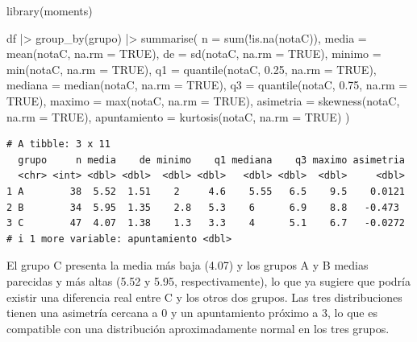 \documentclass[
  spanish,
  a4paper,
]{scrreport}
\newenvironment{Shaded}{\begin{snugshade}}{\end{snugshade}}
\newcommand{\AttributeTok}[1]{\textcolor[rgb]{0.40,0.45,0.13}{#1}}
\newcommand{\ConstantTok}[1]{\textcolor[rgb]{0.56,0.35,0.01}{#1}}
\newcommand{\FloatTok}[1]{\textcolor[rgb]{0.68,0.00,0.00}{#1}}
\newcommand{\FunctionTok}[1]{\textcolor[rgb]{0.28,0.35,0.67}{#1}}
\newcommand{\NormalTok}[1]{\textcolor[rgb]{0.00,0.23,0.31}{#1}}
\newcommand{\SpecialCharTok}[1]{\textcolor[rgb]{0.37,0.37,0.37}{#1}}
\theoremstyle{definition}
\theoremstyle{definition}
\theoremstyle{remark}
\begin{document}
\begin{Shaded}
\begin{Highlighting}[]
\FunctionTok{library}\NormalTok{(moments)}

\NormalTok{df }\SpecialCharTok{|\textgreater{}}
  \FunctionTok{group\_by}\NormalTok{(grupo) }\SpecialCharTok{|\textgreater{}}
  \FunctionTok{summarise}\NormalTok{(}
    \AttributeTok{n =} \FunctionTok{sum}\NormalTok{(}\SpecialCharTok{!}\FunctionTok{is.na}\NormalTok{(notaC)),}
    \AttributeTok{media =} \FunctionTok{mean}\NormalTok{(notaC, }\AttributeTok{na.rm =} \ConstantTok{TRUE}\NormalTok{),}
    \AttributeTok{de =} \FunctionTok{sd}\NormalTok{(notaC, }\AttributeTok{na.rm =} \ConstantTok{TRUE}\NormalTok{),}
    \AttributeTok{minimo =} \FunctionTok{min}\NormalTok{(notaC, }\AttributeTok{na.rm =} \ConstantTok{TRUE}\NormalTok{),}
    \AttributeTok{q1 =} \FunctionTok{quantile}\NormalTok{(notaC, }\FloatTok{0.25}\NormalTok{, }\AttributeTok{na.rm =} \ConstantTok{TRUE}\NormalTok{),}
    \AttributeTok{mediana =} \FunctionTok{median}\NormalTok{(notaC, }\AttributeTok{na.rm =} \ConstantTok{TRUE}\NormalTok{),}
    \AttributeTok{q3 =} \FunctionTok{quantile}\NormalTok{(notaC, }\FloatTok{0.75}\NormalTok{, }\AttributeTok{na.rm =} \ConstantTok{TRUE}\NormalTok{),}
    \AttributeTok{maximo =} \FunctionTok{max}\NormalTok{(notaC, }\AttributeTok{na.rm =} \ConstantTok{TRUE}\NormalTok{),}
    \AttributeTok{asimetria =} \FunctionTok{skewness}\NormalTok{(notaC, }\AttributeTok{na.rm =} \ConstantTok{TRUE}\NormalTok{),}
    \AttributeTok{apuntamiento =} \FunctionTok{kurtosis}\NormalTok{(notaC, }\AttributeTok{na.rm =} \ConstantTok{TRUE}\NormalTok{)}
\NormalTok{  )}
\end{Highlighting}
\end{Shaded}

\begin{verbatim}
# A tibble: 3 x 11
  grupo     n media    de minimo    q1 mediana    q3 maximo asimetria
  <chr> <int> <dbl> <dbl>  <dbl> <dbl>   <dbl> <dbl>  <dbl>     <dbl>
1 A        38  5.52  1.51    2     4.6    5.55   6.5    9.5    0.0121
2 B        34  5.95  1.35    2.8   5.3    6      6.9    8.8   -0.473 
3 C        47  4.07  1.38    1.3   3.3    4      5.1    6.7   -0.0272
# i 1 more variable: apuntamiento <dbl>
\end{verbatim}

El grupo C presenta la media más baja (4.07) y los grupos A y B medias
parecidas y más altas (5.52 y 5.95, respectivamente), lo que ya sugiere
que podría existir una diferencia real entre C y los otros dos grupos.
Las tres distribuciones tienen una asimetría cercana a 0 y un
apuntamiento próximo a 3, lo que es compatible con una distribución
aproximadamente normal en los tres grupos.
\end{document}
